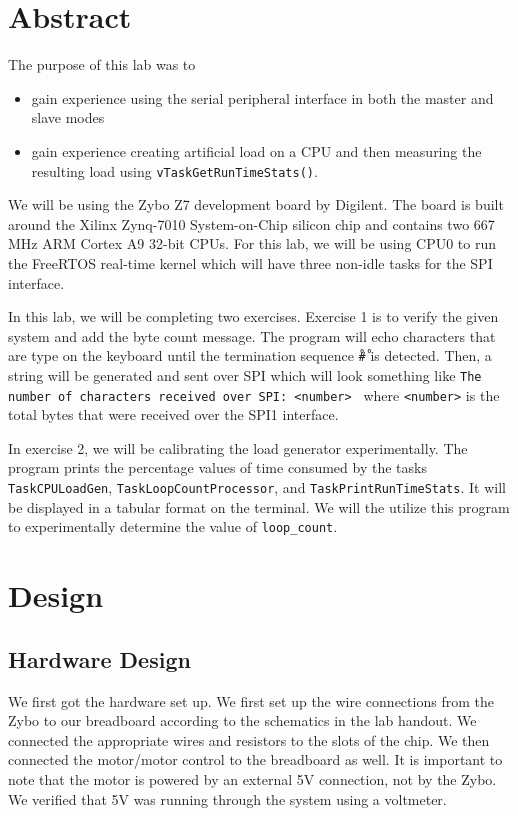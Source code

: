 \documentclass[11pt, letterpaper, titlepage]{article}
\title{\textbf{\Huge{ 
\begin{center}
ECE 315 Lab 4 🧀
\end{center} 
}}}
\author{For Ahmed and Shyama 🎁💯🙏 \\ \\ 🚙 Lora Ma \\ 🌎 Benjamin Kong \\ \\ECE 315 Lab Section H41}
\begin{document}
\maketitle
\thispagestyle{empty}
\tableofcontents 
\newpage
{}

\section{Abstract}
The purpose of this lab was to 
\begin{itemize}
  \item gain experience using the serial peripheral interface in both the master and slave modes
  \item gain experience creating artificial load on a CPU and then measuring the resulting load using \texttt{vTaskGetRunTimeStats()}.
\end{itemize}
We will be using the Zybo Z7 development board by Digilent. The board is built around the Xilinx Zynq-7010 System-on-Chip silicon chip and contains two 667 MHz ARM Cortex A9 32-bit CPUs. For this lab, we will be using CPU0 to run the FreeRTOS real-time kernel which will have three non-idle tasks for the SPI interface. 

In this lab, we will be completing two exercises. Exercise 1 is to verify the given system and add the byte count message. The program will echo characters that are type on the keyboard until the termination sequence \texttt{\r#\r} is detected. Then, a string will be generated and sent over SPI which will look something like \texttt{The number of characters received over SPI: <number> \n} where \texttt{<number>} is the total bytes that were received over the SPI1 interface.

In exercise 2, we will be calibrating the load generator experimentally. The program prints the percentage values of time consumed by the tasks \texttt{TaskCPULoadGen}, \texttt{TaskLoopCountProcessor}, and \texttt{TaskPrintRunTimeStats}. It will be displayed in a tabular format on the terminal. We will the utilize this program to experimentally determine the value of \texttt{loop_count}. 

\section{Design}

\subsection{Hardware Design}
We first got the hardware set up. We first set up the wire connections from the Zybo to our breadboard according to the schematics in the lab handout. We connected the appropriate wires and resistors to the slots of the chip. We then connected the motor/motor control to the breadboard as well. It is important to note that the motor is powered by an external 5V connection, not by the Zybo. We verified that 5V was running through the system using a voltmeter.
\end{document}

